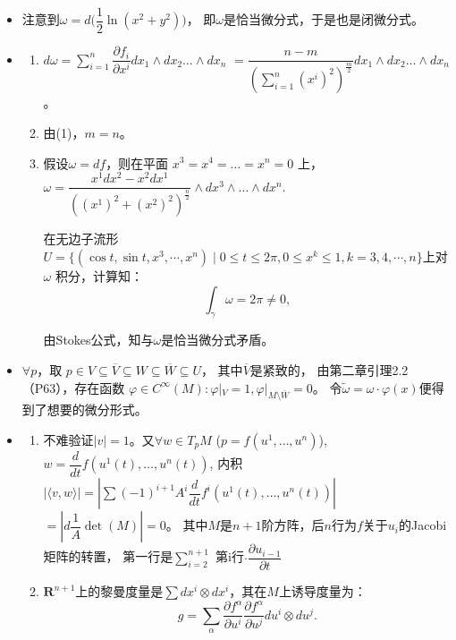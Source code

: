 \begin{itemize}
\item[7.] 
    注意到$\omega=d\big(\dfrac{1}{2}\ln(x^2+y^2)\big)$，
    即$\omega$是恰当微分式，于是也是闭微分式。

\item[8.]
    \begin{enumerate}
        \item[(1)] $d\omega= \sum\limits_{i=1}^{n} \dfrac{\partial f_i}{\partial x^i} dx_1\wedge dx_2 \dots \wedge dx_n$
        $=\dfrac{n-m}{(\sum\limits_{i=1}^{n} (x^i)^2)^{\frac{m}{2}}}dx_1\wedge dx_2 \dots \wedge dx_n$。
        \item[(2)] 由(1)，$m=n$。
        \item[(3)] 假设$\omega = df$，则在平面 $x^3=x^4=\dots =x^n=0$ 上，
        $\omega = \dfrac{x^1dx^2-x^2dx^1}{((x^1)^2+(x^2)^2)^{\frac{n}{2}}}\wedge dx^3 \wedge \dots \wedge dx^n$.

        在无边子流形$U=\{(\cos t,\sin t,x^3,\cdots,x^n)\mid 0\leq t\leq 2\pi, 0\leq x^k\leq 1, k=3,4,\cdots,n\}$上对$\omega$ 积分，计算知：
        $$\int_{\gamma} \omega =2\pi \ne 0,$$
        
        由Stokes公式，知与$\omega$是恰当微分式矛盾。
    \end{enumerate}

\item[9.] 
    $\forall p$，取 $p\in V\subseteq \overline{V} \subseteq W \subseteq \overline{W} \subseteq U$，
    其中$\overline{V}$是紧致的，
    由第二章引理2.2（P63），存在函数 $\varphi\in C^{\infty}(M): \varphi|_V=1, \varphi|_{M\setminus \overline{W}}=0$。
    令$\tilde{\omega}=\omega\cdot\varphi(x) $便得到了想要的微分形式。

\item[10.] 
    \begin{enumerate}
        \item[(1)] 
        不难验证$|v|=1$。又$\forall w \in T_pM$ ($p=f(u^1,\dots,u^n)$), $w=\dfrac{d}{dt}f(u^1(t),\dots,u^n(t))$,
        内积$|\langle v,w\rangle|=|\sum (-1)^{i+1}A^i\dfrac{d}{dt}f^i(u^1(t),\dots,u^n(t))|$
        $=|d\dfrac{1}{A}\det(M)|=0$。
        其中$M$是$n+1$阶方阵，后$n$行为$f$关于$u_i$的Jacobi矩阵的转置，
        第一行是$\sum_{i = 2}^{n+1}  $ 第i行$\cdot \dfrac{\partial u_{i-1}}{\partial t}$ 
        
        \item[(2)] 
        $\mathbf{R}^{n+1}$上的黎曼度量是$\sum dx^i \otimes dx^i$，其在$M$上诱导度量为：
        $$g=\sum_\alpha  \dfrac{\partial f^\alpha}{\partial u^i}\dfrac{\partial f^\alpha}{\partial u^j}du^i\otimes du^j.$$
        

\end{enumerate}
\end{itemize}
